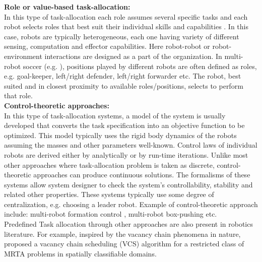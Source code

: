 \textbf{Role or value-based task-allocation:}\\
In this type of task-allocation each role assumes several specific tasks and each robot selects roles that best suit their individual skills and capabilities \cite{Chaimowicz2002}. In this case, robots are typically heterogeneous, each one having variety of different sensing, computation and effector capabilities. Here robot-robot or robot-environment interactions are designed as a part of the organization. In multi-robot soccer (e.g. \cite{Stone+1999}), positions played by different  robots are often defined as roles, e.g. goal-keeper, left/right defender, left/right forwarder etc. The robot, best suited and in closest proximity to available roles/positions, selects to perform that role.\\

\textbf{Control-theoretic approaches:}\\
In this type of task-allocation systems, a model of the system is usually developed that converts the task specification into an objective function to be optimized. This model typically  uses  the rigid  body dynamics of the robots assuming the masses and other parameters well-known. Control laws of individual robots are derived either by analytically or by run-time iterations. Unlike most other approaches where task-allocation problem is taken as discrete, control-theoretic approaches can produce continuous  solutions. The formalisms of these systems allow system designer to check the system's controllability, stability and related other properties.  These systems typically use some degree of centralization, e.g. choosing a leader robot.  Example of control-theoretic approach include: multi-robot formation control \cite{Belta+2004}, multi-robot box-pushing \cite{Pereira+2003 }  etc.\\
Predefined Task allocation through other approaches are also present in robotics literature. For example, inspired by the vacancy chain phenomena in nature, \cite{Dahl+2003} proposed a vacancy chain scheduling (VCS) algorithm for a restricted class of MRTA problems in spatially classifiable domains.
